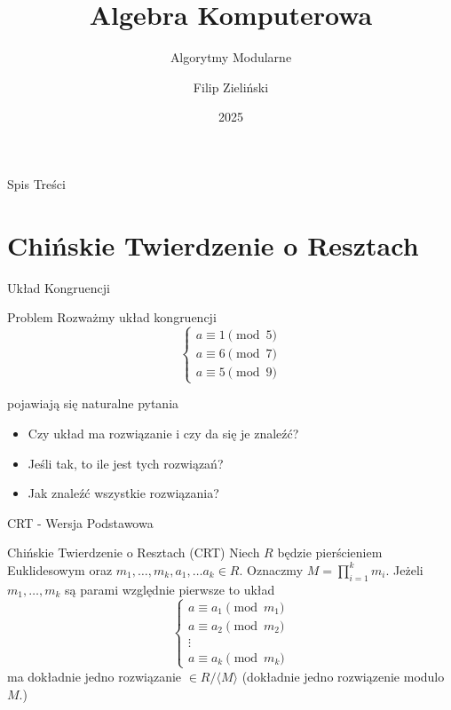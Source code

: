 \documentclass{beamer}
\title{Algebra Komputerowa}
\subtitle{Algorytmy Modularne \cite{ComputerAlgebra,LCM}}
\author{Filip Zieli\'nski}
\date{2025}
\begin{document}
\begin{frame}
    \titlepage
\end{frame}
 
\begin{frame}{Spis Treści}
    \tableofcontents
\end{frame}

\section{Chińskie Twierdzenie o Resztach}
\begin{frame}{Układ Kongruencji}
    \begin{block}{Problem}
        Rozważmy układ kongruencji 
        $$
        \begin{cases}
            a \equiv 1 \pmod{5} \\
            a \equiv 6 \pmod{7} \\
            a \equiv 5 \pmod{9}
        \end{cases}
        $$
    \end{block}
    pojawiają się naturalne pytania 
    \begin{itemize}
        \item Czy układ ma rozwiązanie i czy da się je znaleźć?
        \item Jeśli tak, to ile jest tych rozwiązań?
        \item Jak znaleźć wszystkie rozwiązania?
    \end{itemize}
\end{frame}

\begin{frame}{CRT - Wersja Podstawowa}
    \begin{block}{Chińskie Twierdzenie o Resztach (CRT)}
        Niech $R$ będzie pierścieniem Euklidesowym oraz $m_1, \ldots ,m_k, a_1, \ldots a_k \in R$. Oznaczmy $M = \prod_{i=1}^{k} m_i$.
        Jeżeli $m_1, \ldots, m_k$ są parami względnie pierwsze to układ 
        $$
        \begin{cases}
            a \equiv a_1 \pmod{m_1} \\ 
            a \equiv a_2 \pmod{m_2} \\
            \vdots \\ 
            a \equiv a_k \pmod{m_k}
        \end{cases} 
        $$
        ma dokładnie jedno rozwiązanie $ \in R/ \langle M \rangle $ (dokładnie jedno rozwiązenie modulo $M$.)
    \end{block}
\end{frame}
\end{document}
